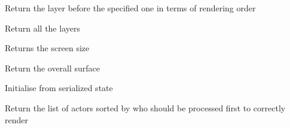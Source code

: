 \documentclass[letterpaper,10pt,english]{sphinxmanual}
\begin{document}
\begin{fulllineitems}
\begin{fulllineitems}
\end{fulllineitems}


\begin{fulllineitems}
\label{renderering:serge.render.Renderer.getLayerBefore}
Return the layer before the specified one in terms of rendering order

\end{fulllineitems}


\begin{fulllineitems}
\label{renderering:serge.render.Renderer.getLayers}
Return all the layers

\end{fulllineitems}


\begin{fulllineitems}
\label{renderering:serge.render.Renderer.getScreenSize}
Returns the screen size

\end{fulllineitems}


\begin{fulllineitems}
\label{renderering:serge.render.Renderer.getSurface}
Return the overall surface

\end{fulllineitems}


\begin{fulllineitems}
\label{renderering:serge.render.Renderer.init}
Initialise from serialized state

\end{fulllineitems}


\begin{fulllineitems}
\label{renderering:serge.render.Renderer.orderActors}
Return the list of actors sorted by who should be processed first to correctly render


\end{fulllineitems}
\end{fulllineitems}
\end{document}
